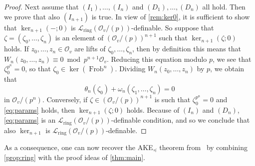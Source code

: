 \documentclass[a4paper]{amsart}
\theoremstyle{mystyle2}
\theoremstyle{mystyle}
\newcommand{\map}[1]{\omega_{#1}}
\DeclareMathOperator{\Frob}{Frob}
\renewcommand{\L}{\mathcal{L}}
\newcommand{\Lring}{\L_{\mathrm{ring}}}
\renewcommand{\O}{\mathcal{O}}
\numberwithin{equation}{section}
\begin{document}
\begin{proof}
        Next assume that $(I_1), \ldots, (I_n)$ and $(D_1), \ldots, (D_n)$ all hold.
        Then we prove that also $(I_{n+1})$ is true.
        In view of \cref{rem:ker0}, it is sufficient to show that $\ker_{n+1}(-; 0)$ is $\Lring(\O_v/(p))$-definable.
        So suppose that $\zeta = (\zeta_0, \ldots, \zeta_n)$ is an element of $(\O_v/(p))^{n+1}$ such that $\ker_{n+1}(\zeta; 0)$ holds.
        If $z_0, \ldots, z_n\in \O_v$ are lifts of $\zeta_0, \ldots, \zeta_n$, then by definition this means that $W_n(z_0, \ldots, z_n) \equiv 0 \bmod p^{n+1}\O_v$.
        Reducing this equation modulo $p$, we see that $\zeta_0^{p^n} = 0$, so that $\zeta_0\in \ker (\Frob^n)$.
        Dividing $W_n(z_0, \ldots, z_n)$ by $p$, we obtain that
        \begin{equation}\label{eq:params}
        \theta_n(\zeta_0) + \map{n}(\zeta_1,\ldots,\zeta_n)=0    
        \end{equation}
        in \( \O_v/(p^n) \).
        Conversely, if $\zeta\in (\O_v/(p))^{n+1}$ is such that $\zeta_0^{p^n} = 0$ and \eqref{eq:params} holds, then $\ker_{n+1}(\zeta; 0)$ holds.
        Because of $(I_n)$ and $(D_n)$, \eqref{eq:params} is an $\Lring(\O_v/(p))$-definable condition, and so we conclude that also $\ker_{n+1}$ is $\Lring(\O_v/(p))$-definable.
    \end{proof}

    As a consequence, one can now recover the AKE\({}_{\preceq}\) theorem from~\cite[Theorem~5.1.4]{jahnke-kartas2023beyond} by combining \cref{prop:ring} with the proof ideas of \cref{thm:main}.
\end{document}
